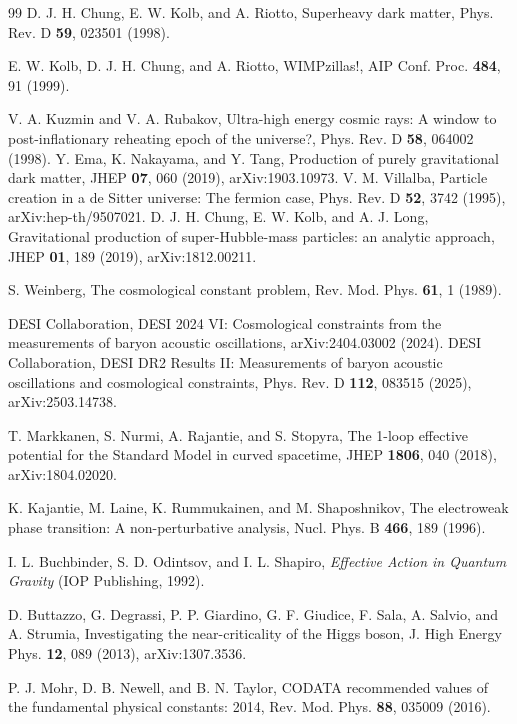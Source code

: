 \documentclass[pdflatex,sn-mathphys-num]{sn-jnl}
\theoremstyle{thmstyleone}
\begin{document}
\begin{thebibliography}{99}
 D. J. H. Chung, E. W. Kolb, and A. Riotto, Superheavy dark matter, Phys. Rev. D \textbf{59}, 023501 (1998).

 E. W. Kolb, D. J. H. Chung, and A. Riotto, WIMPzillas!, AIP Conf. Proc. \textbf{484}, 91 (1999).

 V. A. Kuzmin and V. A. Rubakov, Ultra-high energy cosmic rays: A window to post-inflationary reheating epoch of the universe?, Phys. Rev. D \textbf{58}, 064002 (1998).
 Y. Ema, K. Nakayama, and Y. Tang, Production of purely gravitational dark matter, JHEP \textbf{07}, 060 (2019), arXiv:1903.10973.
 V. M. Villalba, Particle creation in a de Sitter universe: The fermion case, Phys. Rev. D \textbf{52}, 3742 (1995), arXiv:hep-th/9507021.
 D. J. H. Chung, E. W. Kolb, and A. J. Long, Gravitational production of super-Hubble-mass particles: an analytic approach, JHEP \textbf{01}, 189 (2019), arXiv:1812.00211.

 S. Weinberg, The cosmological constant problem, Rev. Mod. Phys. \textbf{61}, 1 (1989).

 DESI Collaboration, DESI 2024 VI: Cosmological constraints from the measurements of baryon acoustic oscillations, arXiv:2404.03002 (2024).
 DESI Collaboration, DESI DR2 Results II: Measurements of baryon acoustic oscillations and cosmological constraints, Phys. Rev. D \textbf{112}, 083515 (2025), arXiv:2503.14738.

 T. Markkanen, S. Nurmi, A. Rajantie, and S. Stopyra, The 1-loop effective potential for the Standard Model in curved spacetime, JHEP \textbf{1806}, 040 (2018), arXiv:1804.02020.

 K. Kajantie, M. Laine, K. Rummukainen, and M. Shaposhnikov, The electroweak phase transition: A non-perturbative analysis, Nucl. Phys. B \textbf{466}, 189 (1996).

 I. L. Buchbinder, S. D. Odintsov, and I. L. Shapiro, \textit{Effective Action in Quantum Gravity} (IOP Publishing, 1992).

 D. Buttazzo, G. Degrassi, P. P. Giardino, G. F. Giudice, F. Sala, A. Salvio, and A. Strumia, Investigating the near-criticality of the Higgs boson, J. High Energy Phys. \textbf{12}, 089 (2013), arXiv:1307.3536.

 P. J. Mohr, D. B. Newell, and B. N. Taylor, CODATA recommended values of the fundamental physical constants: 2014, Rev. Mod. Phys. \textbf{88}, 035009 (2016).


\end{thebibliography}
\end{document}
